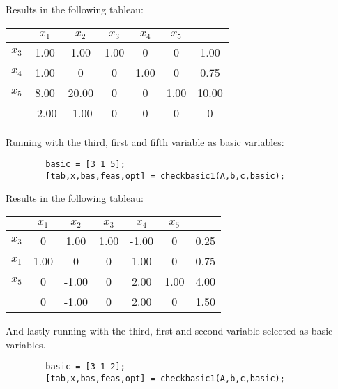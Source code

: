 \documentclass{article}
\begin{document}
    Results in the following tableau:

    \begin{center}
        \begin{tabular}{ | c | c c c c c | c | }
            \hline
                   & $x_1$ & $x_2$ & $x_3$ & $x_4$ & $x_5$ &  \\
            \hline
            $x_3$ & 1.00  & 1.00   & 1.00 & 0   &  0   & 1.00  \\
            $x_4$ & 1.00  & 0      & 0    & 1.00&  0   & 0.75 \\
            $x_5$ & 8.00  & 20.00  & 0    & 0   &  1.00& 10.00 \\
            \hline
                  & -2.00  & -1.00  & 0    & 0   &  0   & 0 \\
            \hline
        \end{tabular}
    \end{center}

    Running with the third, first and fifth variable as basic variables:

    \begin{lstlisting}
        basic = [3 1 5];
        [tab,x,bas,feas,opt] = checkbasic1(A,b,c,basic);
    \end{lstlisting}

    Results in the following tableau:

    \begin{center}
        \begin{tabular}{ | c | c c c c c | c | }
            \hline
                   & $x_1$ & $x_2$ & $x_3$ & $x_4$ & $x_5$ &  \\
            \hline
            $x_3$ & 0  & 1.00   & 1.00 & -1.00   &  0   & 0.25  \\
            $x_1$ & 1.00  & 0      & 0    & 1.00&  0   & 0.75 \\
            $x_5$ & 0  & -1.00  & 0    & 2.00  & 1.00 & 4.00 \\
            \hline
                  & 0  & -1.00  & 0    & 2.00   &  0   & 1.50 \\
            \hline
        \end{tabular}
    \end{center}

    And lastly running with the third, first and second variable selected as
    basic variables.

    \begin{lstlisting}
        basic = [3 1 2];
        [tab,x,bas,feas,opt] = checkbasic1(A,b,c,basic);
    \end{lstlisting}
\end{document}
